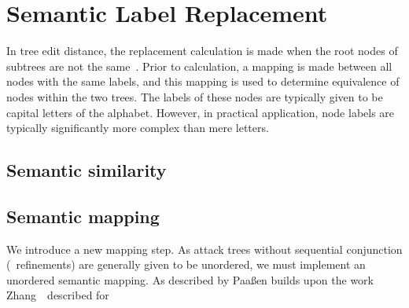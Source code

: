 \section{Semantic Label Replacement}

In tree edit distance, the replacement calculation is made when the root nodes of subtrees are not the same~\cite{zhang_simple_1989}. Prior to calculation, a mapping is made between all nodes with the same labels, and this mapping is used to determine equivalence of nodes within the two trees. The labels of these nodes are typically given to be capital letters of the alphabet. However, in practical application, node labels are typically significantly more complex than mere letters.










\subsection{Semantic similarity}




\subsection{Semantic mapping}

We introduce a new mapping step. As attack trees without sequential conjunction (\SAND\ refinements) are generally given to be unordered, we must implement an unordered semantic mapping. As described by Paa{\ss}en builds upon the work Zhang~\etal\ described for

